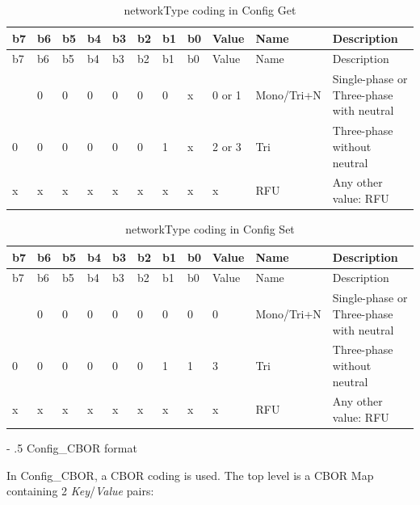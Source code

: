 \documentclass[a4paper]{article}
\makeatletter
\renewcommand\paragraph{%
   \@startsection{paragraph}{4}{0mm}%
      {-\baselineskip}%
      {.5\baselineskip}%
      {\normalfont\normalsize\bfseries}}
\makeatother
\begin{document}
\begin{longtable}[]{@{}lllllllllll@{}}
	\caption{networkType coding in Config Get}
	\label{table.33}
	\tabularnewline
	\toprule\noalign{}
	b7 & b6 & b5 & b4 & b3 & b2 & b1 & b0 & Value  & Name       & Description                 \\
	\midrule\noalign{}
	\endfirsthead
	\toprule\noalign{}
	b7 & b6 & b5 & b4 & b3 & b2 & b1 & b0 & Value  & Name       & Description                 \\
	\midrule\noalign{}
	\endhead
	\bottomrule\noalign{}
	\endlastfoot
	0  & 0  & 0  & 0  & 0  & 0  & 0  & x  & 0 or 1 & Mono/Tri+N & Single-phase or             
	Three-phase with neutral \\
	0  & 0  & 0  & 0  & 0  & 0  & 1  & x  & 2 or 3 & Tri        & Three-phase without neutral \\
	x  & x  & x  & x  & x  & x  & x  & x  & x      & RFU        & Any other value: RFU        \\
\end{longtable}

\begin{longtable}[]{@{}lllllllllll@{}}
	\caption{networkType coding in Config Set}
	\label{table.75}
	\tabularnewline
	\toprule\noalign{}
	b7 & b6 & b5 & b4 & b3 & b2 & b1 & b0 & Value & Name       & Description                 \\
	\midrule\noalign{}
	\endfirsthead
	\toprule\noalign{}
	b7 & b6 & b5 & b4 & b3 & b2 & b1 & b0 & Value & Name       & Description                 \\
	\midrule\noalign{}
	\endhead
	\bottomrule\noalign{}
	\endlastfoot
	0  & 0  & 0  & 0  & 0  & 0  & 0  & 0  & 0     & Mono/Tri+N & Single-phase or             
	Three-phase with neutral \\
	0  & 0  & 0  & 0  & 0  & 0  & 1  & 1  & 3     & Tri        & Three-phase without neutral \\
	x  & x  & x  & x  & x  & x  & x  & x  & x     & RFU        & Any other value: RFU        \\
\end{longtable}
\paragraph{Config\_CBOR format}
\label{config_cbor_format}

In Config\_CBOR, a CBOR coding is used. 
The top level is a CBOR Map containing 2 \emph{Key}/\emph{Value} pairs:
\end{document}
